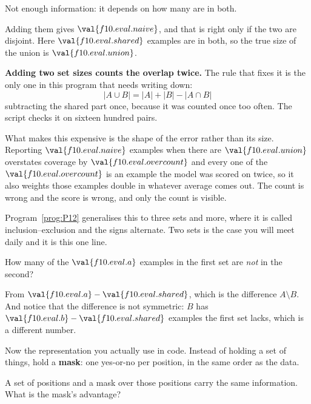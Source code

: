 \begin{fr}
\begin{ansblock}
Not enough information: it depends on how many are in both.
\end{ansblock}

Adding them gives $\val{f10.eval.naive}$, and that is right only if the two
are disjoint. Here $\val{f10.eval.shared}$ examples are in both, so the true
size of the union is $\val{f10.eval.union}$.

\begin{trapbox}
\textbf{Adding two set sizes counts the overlap twice.} The rule that fixes it
is the only one in this program that needs writing down:
\[ \lvert A \cup B \rvert = \lvert A \rvert + \lvert B \rvert
   - \lvert A \cap B \rvert \]
subtracting the shared part once, because it was counted once too often. The
script checks it on sixteen hundred pairs.

What makes this expensive is the shape of the error rather than its size.
Reporting $\val{f10.eval.naive}$ examples when there are $\val{f10.eval.union}$
overstates coverage by $\val{f10.eval.overcount}$ \dash{} and every one of the
$\val{f10.eval.overcount}$ is an example the model was scored on twice, so it
also weights those examples double in whatever average comes out. The count is
wrong and the score is wrong, and only the count is visible.

Program~\ref{prog:P12} generalises this to three sets and more, where it is
called inclusion--exclusion and the signs alternate. Two sets is the case you
will meet daily and it is this one line.
\end{trapbox}

\end{fr}

\begin{fr}
How many of the $\val{f10.eval.a}$ examples in the first set are \emph{not} in
the second?
\nextframe
\end{fr}

\begin{fr}
From $\val{f10.eval.a} - \val{f10.eval.shared}$, which is the difference
$A \setminus B$. And notice that the difference is not symmetric: $B$ has
$\val{f10.eval.b} - \val{f10.eval.shared}$ examples the first set lacks, which
is a different number.

Now the representation you actually use in code. Instead of holding a set of
things, hold a \textbf{mask}: one yes-or-no per position, in the same order as
the data.

A set of positions and a mask over those positions carry the same information.
What is the mask's advantage?
\nextframe
\end{fr}

